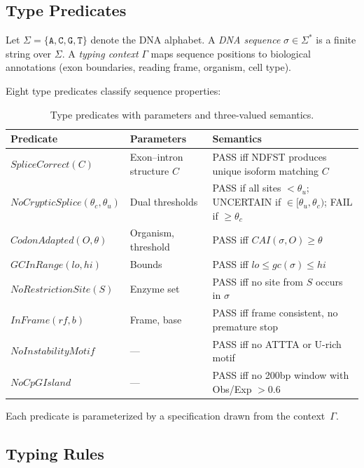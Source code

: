 \documentclass[runningheads]{llncs}
\newcommand{\seq}{\sigma}
\begin{document}
\subsection{Type Predicates}\label{sec:predicates}

Let $\Sigma = \{\texttt{A}, \texttt{C}, \texttt{G}, \texttt{T}\}$
denote the DNA alphabet.
A \emph{DNA sequence} $\seq \in \Sigma^*$ is a finite string over
$\Sigma$.
A \emph{typing context} $\Gamma$ maps sequence positions to biological
annotations (exon boundaries, reading frame, organism, cell type).

Eight type predicates classify sequence properties:

\begin{table}[t]
\centering
\caption{Type predicates with parameters and three-valued semantics.}
\label{tab:predicates}
\begin{tabular}{llp{5.0cm}}
\toprule
\textbf{Predicate} & \textbf{Parameters} & \textbf{Semantics} \\
\midrule
$\mathit{SpliceCorrect}(C)$ & Exon--intron structure $C$ &
  PASS iff NDFST produces unique isoform matching $C$ \\
$\mathit{NoCrypticSplice}(\theta_c,\theta_u)$ & Dual thresholds &
  PASS if all sites $< \theta_u$; UNCERTAIN if $\in [\theta_u,
  \theta_c)$; FAIL if $\ge \theta_c$ \\
$\mathit{CodonAdapted}(O,\theta)$ & Organism, threshold &
  PASS iff $\mathit{CAI}(\seq, O) \ge \theta$ \\
$\mathit{GCInRange}(lo,hi)$ & Bounds &
  PASS iff $lo \le \mathit{gc}(\seq) \le hi$ \\
$\mathit{NoRestrictionSite}(S)$ & Enzyme set &
  PASS iff no site from $S$ occurs in $\seq$ \\
$\mathit{InFrame}(rf,b)$ & Frame, base &
  PASS iff frame consistent, no premature stop \\
$\mathit{NoInstabilityMotif}$ & --- &
  PASS iff no ATTTA or U-rich motif \\
$\mathit{NoCpGIsland}$ & --- &
  PASS iff no 200bp window with Obs/Exp $> 0.6$ \\
\bottomrule
\end{tabular}
\end{table}

Each predicate is parameterized by a specification drawn from the
context~$\Gamma$.

\subsection{Typing Rules}\label{sec:typingrules}
\end{document}
